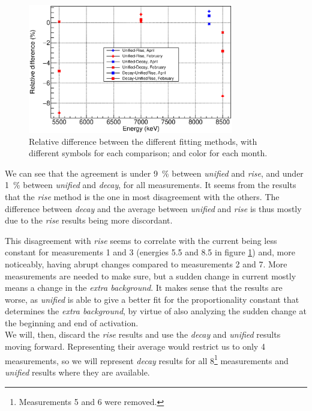 \documentclass[a4paper,12pt]{report}
\begin{document}
\begin{figure}[H]
	\centering
	\includegraphics[width=0.80\textwidth]{activation_method_comparison.eps}
	\caption{Relative difference between the different fitting methods, with different symbols for each comparison; and color for each month.}
	\label{activation_method_comparison}
\end{figure}

We can see that the agreement is under \qty{9}{\percent} between \textit{unified} and \textit{rise}, and under \qty{1}{\percent} between \textit{unified} and \textit{decay}, for all measurements.
It seems from the results that the \textit{rise} method is the one in most disagreement with the others.
The difference between \textit{decay} and the average between \textit{unified} and \textit{rise} is thus mostly due to the \textit{rise} results being more discordant.

This disagreement with \textit{rise} seems to correlate with the current being less constant for measurements 1 and 3 (energies \num{5.5} and \num{8.5} in figure \ref{activation_method_comparison}) and, more noticeably, having abrupt changes compared to measurements 2 and 7.
More measurements are needed to make sure, but a sudden change in current mostly means a change in the \textit{extra background}.
It makes sense that the results are worse, as \textit{unified} is able to give a better fit for the proportionality constant that determines the \textit{extra background}, by virtue of also analyzing the sudden change at the beginning and end of activation.
\\

We will, then, discard the \textit{rise} results and use the \textit{decay} and \textit{unified} results moving forward.
Representing their average would restrict us to only 4 measurements, so we will represent \textit{decay} results for all 8\footnote{Measurements 5 and 6 were removed.} measurements and \textit{unified} results where they are available.
\end{document}
